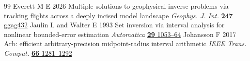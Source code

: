 \documentclass[anonymous,12pt]{iopjournal}
\theoremstyle{remark}\newtheorem{remark}[theorem]{Remark}
\numberwithin{equation}{section}
\begin{document}
\begin{thebibliography}{99}
Everett M E 2026 Multiple solutions to geophysical inverse problems via tracking flights across a deeply incised model landscape \emph{Geophys. J. Int.} \href{https://doi.org/10.1093/gji/ggag432}{\textbf{247} ggag432}
Jaulin L and Walter E 1993 Set inversion via interval analysis for nonlinear bounded-error estimation \emph{Automatica} \href{https://doi.org/10.1016/0005-1098(93)90106-4}{\textbf{29} 1053--64}
 Johansson F 2017 Arb: efficient arbitrary-precision midpoint-radius interval arithmetic \emph{IEEE Trans. Comput.} \href{https://doi.org/10.1109/TC.2017.2690633}{\textbf{66} 1281--1292}
\end{thebibliography}
\end{document}
